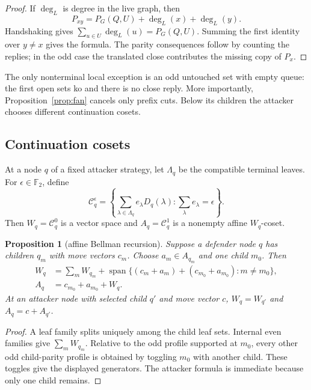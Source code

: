 \documentclass[11pt]{article}
\newtheorem{proposition}[theorem]{Proposition}
\theoremstyle{definition}
\theoremstyle{remark}
\begin{document}
\begin{proof}
If $\deg_L$ is degree in the live graph, then
\[
  P_{xy}=P_G(Q,U)+\deg_L(x)+\deg_L(y).
\]
Handshaking gives $\sum_{u\in U}\deg_L(u)=P_G(Q,U)$.  Summing the first
identity over $y\ne x$ gives the formula.  The parity consequences follow by
counting the replies; in the odd case the translated close contributes the
missing copy of $P_x$.
\end{proof}

The only nonterminal local exception is an odd untouched set with empty
queue: the first open sets ko and there is no close reply.  More importantly,
Proposition~\ref{prop:fan} cancels only prefix cuts.  Below its children the
attacker chooses different continuation cosets.

\subsection{Continuation cosets}

At a node $q$ of a fixed attacker strategy, let $\Lambda_q$ be the compatible
terminal leaves.  For $\epsilon\in\mathbb F_2$, define
\[
  \mathcal C_q^\epsilon=
  \left\{\sum_{\lambda\in\Lambda_q}e_\lambda D_q(\lambda):
          \sum_\lambda e_\lambda=\epsilon\right\}.
\]
Then $W_q=\mathcal C_q^0$ is a vector space and
$A_q=\mathcal C_q^1$ is a nonempty affine $W_q$-coset.

\begin{proposition}[affine Bellman recursion]\label{prop:convolution}
Suppose a defender node $q$ has children $q_m$ with move vectors $c_m$.
Choose $a_m\in A_{q_m}$ and one child $m_0$.  Then
\[
\begin{aligned}
W_q&=\sum_mW_{q_m}+
 \operatorname{span}\{(c_m+a_m)+(c_{m_0}+a_{m_0}):m\ne m_0\},\\
A_q&=c_{m_0}+a_{m_0}+W_q.
\end{aligned}
\]
At an attacker node with selected child $q'$ and move vector $c$,
$W_q=W_{q'}$ and $A_q=c+A_{q'}$.
\end{proposition}

\begin{proof}
A leaf family splits uniquely among the child leaf sets.  Internal even
families give $\sum_mW_{q_m}$.  Relative to the odd profile supported at
$m_0$, every other odd child-parity profile is obtained by toggling $m_0$
with another child.  These toggles give the displayed generators.  The
attacker formula is immediate because only one child remains.
\end{proof}
\end{document}

